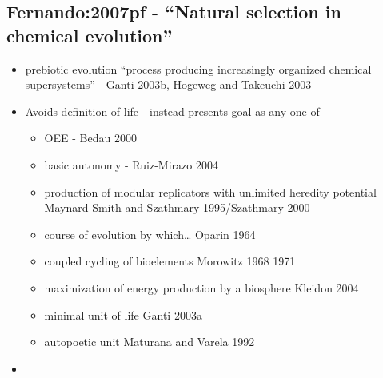 		\hypertarget{fernando2007pf---natural-selection-in-chemical-evolution}{\subsection{Fernando:2007pf
				- ``Natural selection in chemical
				evolution''}\label{fernando2007pf---natural-selection-in-chemical-evolution}}
		
		\begin{itemize}
			\item
			
			prebiotic evolution ``process producing increasingly organized
			chemical supersystems'' - Ganti 2003b, Hogeweg and Takeuchi 2003
			
			\item
			
			Avoids definition of life - instead presents goal as any one of
			
			
			\begin{itemize}
				\item
				
				OEE - Bedau 2000
				
				\item
				
				basic autonomy - Ruiz-Mirazo 2004
				
				\item
				
				production of modular replicators with unlimited heredity potential
				Maynard-Smith and Szathmary 1995/Szathmary 2000
				
				\item
				
				course of evolution by which\ldots{} Oparin 1964
				
				\item
				
				coupled cycling of bioelements Morowitz 1968 1971
				
				\item
				
				maximization of energy production by a biosphere Kleidon 2004
				
				\item
				
				minimal unit of life Ganti 2003a
				
				\item
				
				autopoetic unit Maturana and Varela 1992
				
			\end{itemize}
			\item
			

\end{itemize}
